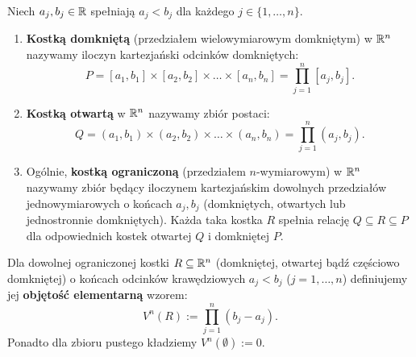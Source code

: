 \begin{defi}[Kostka w $\Rn$]
    Niech $a_j, b_j \in \mathbb{R}$ spełniają $a_j < b_j$ dla każdego $j \in \{1, \ldots, n\}$.

    \begin{enumerate}
        \item \textbf{Kostką domkniętą} (przedziałem wielowymiarowym domkniętym) w $\Rn$ nazywamy iloczyn kartezjański odcinków domkniętych:
              \begin{equation*} P = [a_1, b_1] \times [a_2, b_2] \times \ldots \times [a_n, b_n] = \prod_{j=1}^n [a_j, b_j].
              \end{equation*}
        \item \textbf{Kostką otwartą} w $\Rn$ nazywamy zbiór postaci:
              \begin{equation*} Q = (a_1, b_1) \times (a_2, b_2) \times \ldots \times (a_n, b_n) = \prod_{j=1}^n (a_j, b_j).
              \end{equation*}
        \item Ogólnie, \textbf{kostką ograniczoną} (przedziałem $n$-wymiarowym) w $\Rn$ nazywamy zbiór będący iloczynem kartezjańskim dowolnych przedziałów jednowymiarowych o końcach $a_j, b_j$ (domkniętych, otwartych lub jednostronnie domkniętych). Każda taka kostka $R$ spełnia relację $Q \subseteq  R \subseteq  P$ dla odpowiednich kostek otwartej $Q$ i domkniętej $P$.
    \end{enumerate}
\end{defi}

\begin{defi} Dla dowolnej ograniczonej kostki $R \subseteq \mathbb{R}^{n}$ (domkniętej, otwartej bądź częściowo domkniętej) o końcach odcinków krawędziowych $a_j < b_j$ ($j = 1, \ldots, n$) definiujemy jej \textbf{objętość elementarną} wzorem:
    \begin{equation*}
        V^n(R) := \prod_{j=1}^n (b_j - a_j).
    \end{equation*}
    Ponadto dla zbioru pustego kładziemy $V^n(\emptyset) := 0$.
\end{defi}

